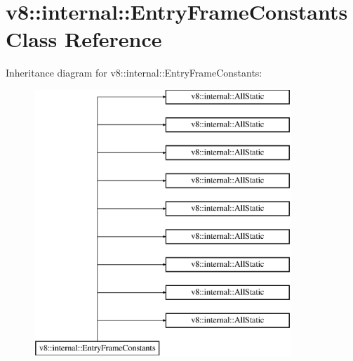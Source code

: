 \hypertarget{classv8_1_1internal_1_1_entry_frame_constants}{}\section{v8\+:\+:internal\+:\+:Entry\+Frame\+Constants Class Reference}
\label{classv8_1_1internal_1_1_entry_frame_constants}
Inheritance diagram for v8\+:\+:internal\+:\+:Entry\+Frame\+Constants\+:\begin{figure}[H]
\begin{center}
\leavevmode
\includegraphics[height=10.000000cm]{classv8_1_1internal_1_1_entry_frame_constants}
\end{center}
\end{figure}
